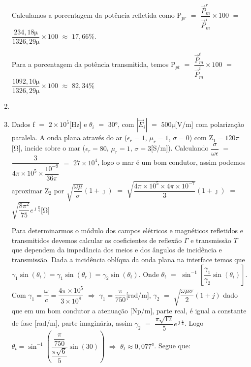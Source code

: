 \begin{enumerate}[1.]
Calculamos a porcentagem da potência refletida como P$_{pr}$ $=$ $\dfrac{\vec{P}_{m}^{r}}{\vec{P}_{m}^{i}} \times 100$ $=$ $\dfrac{234,18 \si{\micro}}{1326,29 \si{\micro}} \times 100$ $\approx$ $17,66$\%.

Para a porcentagem da potência transmitida, temos P$_{pt}$ $=$ $\dfrac{\vec{P}_{m}^{t}}{\vec{P}_{m}^{i}} \times 100$ $=$ $\dfrac{1092,10 \si{\micro}}{1326,29 \si{\micro}} \times 100$ $\approx$ $82,34$\%

\newpage

\item 

\newpage

\item Dados f $=$ $2 \times 10^{5}$[\si{\hertz}] e $\theta_{i}$ $=$ $30$\si{\degree}, com $|\vec{E}_{i}|$ $=$ $500\si{\micro}$[\si{\volt/\meter}] com polarização paralela. A onda plana através do ar ($\epsilon_{r} = 1$, $\mu_{r} = 1$, $\sigma = 0$) com Z$_{1} = 120\pi$[\si{\ohm}], incide sobre o mar ($\epsilon_{r} = 80$, $\mu_{r} = 1$, $\sigma = 3$[\si{\siemens/\meter}]). Calculando $\dfrac{\sigma}{\omega\epsilon}$ $=$ $\dfrac{3}{4\pi \times 10^{5} \times \dfrac{10^{-9}}{36\pi}}$ $=$ $27 \times 10^{4}$, logo o mar é um bom condutor, assim podemos aproximar Z$_{2}$ por $\sqrt{\dfrac{\omega\mu}{\sigma}}(1 + \jmath)$ $=$ $\sqrt{\dfrac{4\pi \times 10^{5} \times 4\pi \times 10^{-7}}{3}}(1 + \jmath)$ $=$ $\sqrt{\dfrac{8\pi^{2}}{75}}e^{\jmath\frac{\pi}{4}}$[\si{\ohm}]

Para determinarmos o módulo dos campos elétricos e magnéticos refletidos e transmitidos devemos calcular os coeficientes de reflexão $\Gamma$ e transmissão $T$ que dependem da impedância dos meios e dos ângulos de incidência e transmissão. Dada a incidência oblíqua da onda plana na interface temos que $\gamma_{1}\sin(\theta_i) = \gamma_{1}\sin(\theta_{r}) = \gamma_{2}\sin(\theta_{t})$. Onde $\theta_{t}$ $=$ $\sin^{-1}\left[\dfrac{\gamma_{1}}{\gamma_{2}}\sin(\theta_{i})\right]$. Com $\gamma_{1} = \dfrac{\omega}{c} = \dfrac{4\pi \times 10^{5}}{3 \times 10^{8}}$ $\Rightarrow$ $\gamma_{1} = \dfrac{\pi}{750}$[\si{\radian/\meter}], $\gamma_{2}$ $=$ $\sqrt{\dfrac{\omega\mu\sigma}{2}}(1 + j)$ dado que em um bom condutor a atenuação [\si{\neper/\meter}], parte real, é igual a constante de fase [\si{\radian/\meter}], parte imaginária, assim $\gamma_{2}$ $=$ $\dfrac{\pi\sqrt{12}}{5}e^{\jmath\frac{\pi}{4}}$. Logo $\theta_{t} = \sin^{-1}\left(\dfrac{\dfrac{\pi}{750}}{\dfrac{\pi\sqrt{6}}{5}}\sin(30)\right)$ $\Rightarrow$ $\theta_{t} \approx 0,077$\si{\degree}. Segue que:


\end{enumerate}
